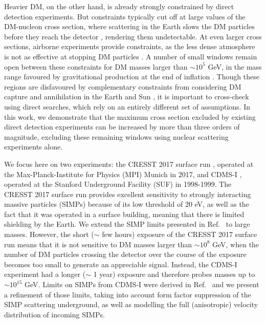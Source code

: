 \documentclass[prd,twocolumn,showpacs,nofootinbib,aps]{revtex4-1}
\begin{document}
Heavier DM, on the other hand, is already strongly constrained by direct detection experiments. But constraints typically cut off at large values of the DM-nucleon cross section, where scattering in the Earth slows the DM particles before they reach the detector \cite{Starkman:1990nj,Albuquerque:2003ei}, rendering them undetectable. At even larger cross sections, airborne experiments provide constraints, as the less dense atmosphere is not as effective at stopping DM particles \cite{Davis:2017noy}. A number of small windows remain open between these constraints for DM masses larger than $\sim10^5$ GeV, in the mass range favoured by gravitational production at the end of inflation \cite{Hui:1998dc,Allahverdi:2002nb,Kannike:2016jfs}. Though these regions are disfavoured by complementary constraints from considering DM capture and annihilation in the Earth and Sun \cite{Mack:2007xj,Albuquerque:2010bt,Mack:2012ju}, it is important to cross-check using direct searches, which rely on an entirely different set of assumptions. In this work, we demonstrate that the maximum cross section excluded by existing direct detection experiments can be increased by more than three orders of magnitude, excluding these remaining windows using nuclear scattering experiments alone.

We focus here on two experiments: the CRESST 2017 surface run \cite{Angloher:2017sxg}, operated at the Max-Planck-Institute for Physics (MPI) Munich in 2017, and CDMS-I \cite{Abusaidi:2000wg,Abrams:2002nb}, operated at the Stanford Underground Facility (SUF) in 1998-1999. The CRESST 2017 surface run provides excellent sensitivity to strongly interacting massive particles (SIMPs) because of its low threshold of 20 eV, as well as the fact that it was operated in a surface building, meaning that there is limited shielding by the Earth. We extend the SIMP limits presented in Ref.~\cite{Davis:2017noy} to large masses. However, the short  ($\sim$ few hours) exposure of the CRESST 2017 surface run means that it is not sensitive to DM masses larger than $\sim10^8$ GeV, when the number of DM particles crossing the detector over the course of the exposure becomes too small to generate an appreciable signal. Instead, the CDMS-I experiment had a longer ($\sim$ 1 year) exposure and therefore probes masses up to  $\sim10^{15}$ GeV. Limits on SIMPs from CDMS-I were derived in Ref.~\cite{Albuquerque:2003ei} and we present a refinement of those limits, taking into account form factor suppression of the SIMP scattering underground, as well as modelling the full (anisotropic) velocity distribution of incoming SIMPs.
\end{document}
